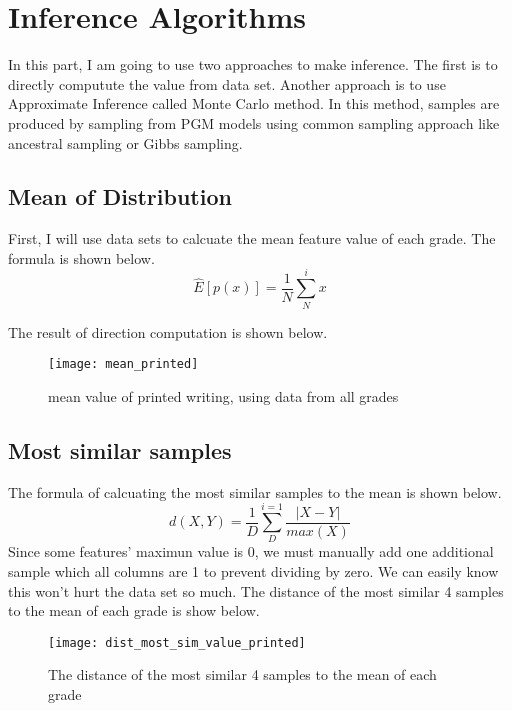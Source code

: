 \documentclass{article}
\begin{document}
\section{Inference Algorithms} 
In this part, I am going to use two approaches to make inference. The first is to 
directly computute the value from data set. Another approach is to use Approximate
Inference called Monte Carlo method. In this method, samples are produced by sampling
from PGM models using common sampling approach like ancestral sampling or Gibbs sampling.
\subsection{Mean of Distribution}
First, I will use data sets to calcuate the mean feature value of each grade.
The formula is shown below.
\begin{equation}
	\label{eq:mean-hat}
	\hat{E}[p(x)]=\frac{1}{N}\sum_{N}^{i}x
\end{equation}

The result of direction computation is shown below.
\begin{figure}[ht]
		\vskip 0.1in
		\begin{center}
				\centerline{\texttt{[image: mean\_printed]}}
				\caption{mean value of printed writing, using data from all grades}
		\end{center}
		\vskip -0.1in
\end{figure}

\subsection{Most similar samples}
The formula of calcuating the most similar samples to the mean is
shown below.
\begin{equation}
		d(X,Y)=\frac{1}{D}\sum_{D}^{i=1}\frac{|X-Y|}{max(X)}
\end{equation}
Since some features' maximun value is 0, we must manually add one
additional sample which all columns are 1 to prevent dividing by zero.
We can easily know this won't hurt the data set so much.
The distance of the most similar 4 samples to the mean of each grade is show below.
\begin{figure}[ht]
		\vskip 0.1in
		\begin{center}
				\centerline{\texttt{[image: dist\_most\_sim\_value\_printed]}}
				\caption{The distance of the most similar 4 samples to the mean of each grade}
		\end{center}
		\vskip -0.1in
\end{figure}
\end{document}
